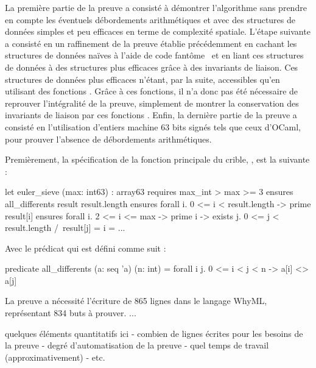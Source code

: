 \documentclass[a4paper]{easychair}
\begin{document}
La première partie de la preuve a consisté à démontrer l'algorithme sans prendre
en compte les éventuels débordements arithmétiques et avec des structures
de données simples et peu efficaces en terme de complexité spatiale.
L'étape suivante a consisté en un raffinement de la preuve établie précédemment
en cachant les structures de données naïves à l'aide de code
fantôme~\cite{ghost-code} et en liant ces structures de données à des structures
plus efficaces grâce à des invariants de liaison. Ces structures de données plus
efficaces n'étant, par la suite, accessibles qu'en utilisant des fonctions
. Grâce à ces fonctions, il n'a donc pas été
nécessaire de reprouver l'intégralité de la preuve, simplement de montrer la
conservation des invariants de liaison par ces fonctions .
Enfin, la dernière partie de la preuve a consisté en l'utilisation d'entiers
machine 63 bits signés tels que ceux d'OCaml, pour prouver l'absence de
débordements arithmétiques.

Premièrement, la spécification de la fonction principale du crible,
, est la suivante :

\begin{why3}
let euler_sieve (max: int63) : array63
  requires { max_int > max >= 3                               }
  ensures  { all_differents result result.length              }
  ensures  { forall i. 0 <= i < result.length -> prime result[i]   }
  ensures  { forall i. 2 <= i <= max -> prime i ->
                  exists j. 0 <= j < result.length /\ result[j] = i }
= ...
\end{why3}

Avec le prédicat  qui est défini comme suit :

\begin{why3}
predicate all_differents (a: seq 'a) (n: int) =
    forall i j. 0 <= i < j < n -> a[i] <> a[j]
\end{why3}




La preuve a nécessité l'écriture de 865 lignes dans le langage WhyML,
représentant 834 buts à prouver.
...

quelques éléments quantitatifs ici
- combien de lignes écrites pour les besoins de la preuve
- degré d'automatisation de la preuve
- quel temps de travail (approximativement)
- etc.
\end{document}
